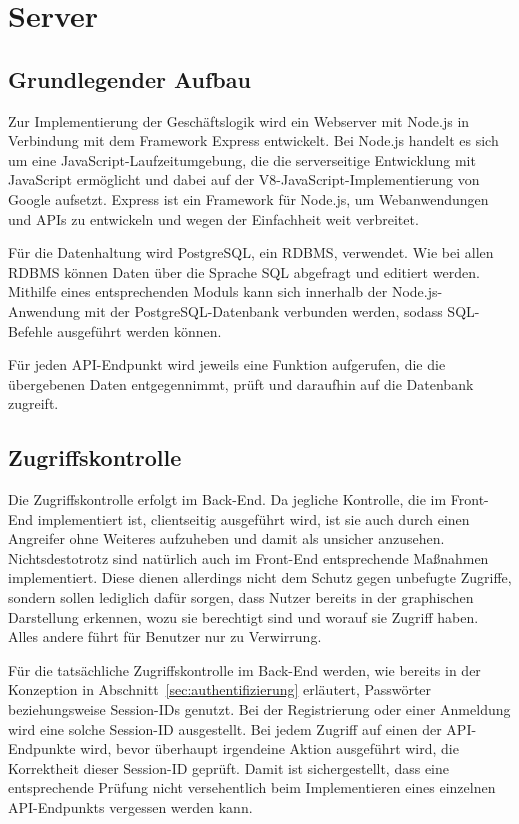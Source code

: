 \section{Server}

\subsection{Grundlegender Aufbau}
Zur Implementierung der Geschäftslogik wird ein Webserver mit Node.js in Verbindung mit dem Framework Express entwickelt.
Bei Node.js handelt es sich um eine JavaScript-Laufzeitumgebung, die die serverseitige Entwicklung mit JavaScript ermöglicht und dabei auf der V8-JavaScript-Implementierung von Google aufsetzt.\autocite[Vgl.][]{nl-openjsfoundation2020nodejs}
Express ist ein Framework für Node.js, um Webanwendungen und \acsp{API} zu entwickeln und wegen der Einfachheit weit verbreitet.\autocite[Vgl.][]{nl-strongloop2017express}

Für die Datenhaltung wird PostgreSQL, ein \ac{RDBMS}, verwendet.
Wie bei allen \acs{RDBMS} können Daten über die Sprache \acs{SQL} abgefragt und editiert werden. %
Mithilfe eines entsprechenden Moduls kann sich innerhalb der Node.js-Anwendung mit der PostgreSQL-Datenbank verbunden werden, sodass \acs{SQL}-Befehle ausgeführt werden können.\autocite[Vgl.][]{nl-carlson2020nodepostgres}

Für jeden \acs{API}-Endpunkt wird jeweils eine Funktion aufgerufen, die die übergebenen Daten entgegennimmt, prüft und daraufhin auf die Datenbank zugreift.

\subsection{Zugriffskontrolle}
Die Zugriffskontrolle erfolgt im Back-End.
Da jegliche Kontrolle, die im Front-End implementiert ist, clientseitig ausgeführt wird, ist sie auch durch einen Angreifer ohne Weiteres aufzuheben und damit als unsicher anzusehen.
Nichtsdestotrotz sind natürlich auch im Front-End entsprechende Maßnahmen implementiert.
Diese dienen allerdings nicht dem Schutz gegen unbefugte Zugriffe, sondern sollen lediglich dafür sorgen, dass Nutzer bereits in der graphischen Darstellung erkennen, wozu sie berechtigt sind und worauf sie Zugriff haben.
Alles andere führt für Benutzer nur zu Verwirrung.

Für die tatsächliche Zugriffskontrolle im Back-End werden, wie bereits in der Konzeption in Abschnitt~\ref{sec:authentifizierung} erläutert, Passwörter beziehungsweise Session-IDs genutzt.
Bei der Registrierung oder einer Anmeldung wird eine solche Session-ID ausgestellt.
Bei jedem Zugriff auf einen der \acs{API}-Endpunkte wird, bevor überhaupt irgendeine Aktion ausgeführt wird, die Korrektheit dieser Session-ID geprüft.
Damit ist sichergestellt, dass eine entsprechende Prüfung nicht versehentlich beim Implementieren eines einzelnen \acs{API}-Endpunkts vergessen werden kann.

